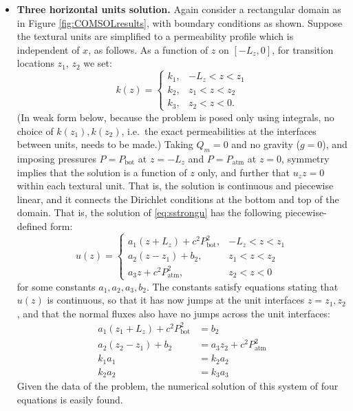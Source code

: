 \documentclass[11pt]{amsart}
\newcommand{\Patm}{P_{\text{atm}}}
\newcommand{\Pbot}{P_{\text{bot}}}
\begin{document}
\begin{itemize}
\item \textbf{Three horizontal units solution.}  Again consider a rectangular domain as in Figure \ref{fig:COMSOLresults}, with boundary conditions as shown.  Suppose the textural units are simplified to a permeability profile which is independent of $x$, as follows.  As a function of $z$ on $[-L_z,0]$, for transition locations $z_1$, $z_2$ we set:
\begin{equation}
k(z) = \begin{cases} k_1, & -L_z < z < z_1 \\
                     k_2, & z_1 < z < z_2 \\
                     k_3, & z_2 < z < 0. \end{cases}
\end{equation}
(In weak form below, because the problem is posed only using integrals, no choice of $k(z_1),k(z_2)$, i.e.~the exact permeabilities at the interfaces between units, needs to be made.)  Taking $Q_m=0$ and no gravity ($g=0$), and imposing pressures $P=\Pbot$ at $z=-L_z$ and $P=\Patm$ at $z=0$, symmetry implies that the solution is a function of $z$ only, and further that $u_zz=0$ within each textural unit.  That is, the solution is continuous and piecewise linear, and it connects the Dirichlet conditions at the bottom and top of the domain.  That is, the solution of \eqref{eq:sstrongu} has the following piecewise-defined form:
\begin{equation}
u(z) = \begin{cases} a_1 (z + L_z) + c^2 \Pbot^2, & -L_z < z < z_1 \\
                     a_2 (z - z_1) + b_2, & z_1 < z < z_2 \\
                     a_3 z + c^2 \Patm^2, & z_2 < z < 0 \end{cases} \label{eq:threehor}
\end{equation}
for some constants $a_1, a_2, a_3, b_2$.  The constants satisfy equations stating that $u(z)$ is continuous, so that it has now jumps at the unit interfaces $z=z_1,z_2$, and that the normal fluxes also have no jumps across the unit interfaces:
\begin{align*}
a_1 (z_1+L_z) + c^2 \Pbot^2 &= b_2 \\
a_2 (z_2-z_1) + b_2 &= a_3 z_2 + c^2 \Patm^2 \\
k_1 a_1 &= k_2 a_2 \\
k_2 a_2 &= k_3 a_3
\end{align*}
Given the data of the problem, the numerical solution of this system of four equations is easily found.
\end{itemize}
\end{document}
